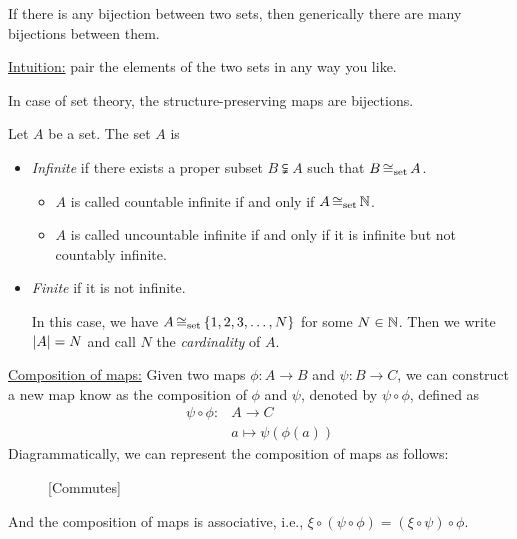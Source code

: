\begin{remark}
	If there is any bijection between two sets, then generically there are many bijections between them.

	\noindent \uline{Intuition:} pair the elements of the two sets in any way you like.
\end{remark}
In case of set theory, the structure-preserving maps are bijections.

\begin{definition}
	Let \(A\) be a set. The set \(A\) is
	\begin{itemize}
		\item \emph{Infinite} if there exists a proper subset \(B \subsetneqq A\) such that \(B \operatorname{\cong_{\text{set}}} A\).
		      \begin{itemize}[$*$]
			      \item \(A\) is called countable infinite if and only if \(A \operatorname{\cong_{\text{set}}} \mathbb N\).
			      \item \(A\) is called uncountable infinite if and only if it is infinite but not countably infinite.
		      \end{itemize}
		\item \emph{Finite} if it is not infinite.

		      In this case, we have \(A \operatorname{\cong_{\text{set}}} \qty{1, 2, 3, \ldots, N}\) for some \(N \in \mathbb N\). Then we write \(\abs{A} = N\) and call \(N\) the \emph{cardinality} of \(A\).
	\end{itemize}
\end{definition}

\noindent \uline{Composition of maps:} Given two maps \(\phi: A \to B\) and \(\psi: B \to C\), we can construct a new map know as the composition of \(\phi\) and \(\psi\), denoted by \(\psi \circ \phi\), defined as
\begin{align*}
	\psi \circ \phi: & A \to C                 \\
	                 & a \mapsto \psi(\phi(a))
\end{align*}
Diagrammatically, we can represent the composition of maps as follows:
\begin{figure}[H]
	\centering
	[Commutes]
	\label{fig:composition_of_maps}
\end{figure}\noindent
And the composition of maps is associative, i.e., \(\xi \circ (\psi \circ \phi) = (\xi \circ \psi) \circ \phi\).

